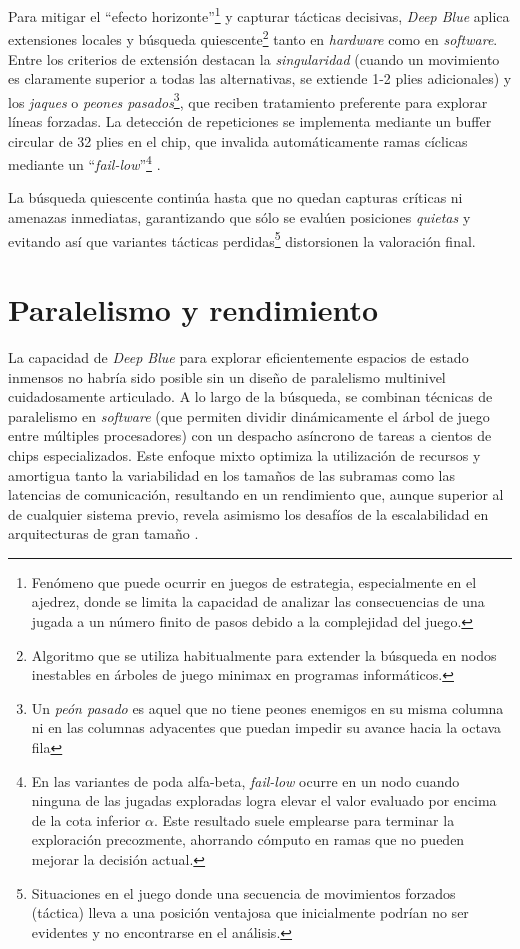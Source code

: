 \documentclass[a4paper, 12pt]{article}
\begin{document}
Para mitigar el “efecto horizonte”\footnote{Fenómeno que puede ocurrir 
en juegos de estrategia, especialmente en el ajedrez, donde se 
limita la capacidad de analizar las consecuencias de una jugada 
a un número finito de pasos debido a la complejidad del juego.} 
y capturar tácticas 
decisivas, \textit{Deep Blue} aplica extensiones locales y 
búsqueda quiescente\footnote{Algoritmo que se utiliza 
habitualmente para extender la búsqueda en nodos inestables en 
árboles de juego minimax en programas informáticos.} 
tanto en \emph{hardware} como en \emph{software}. 
Entre los criterios de extensión destacan la \emph{singularidad} 
(cuando un movimiento es claramente superior a todas las alternativas, 
se extiende 1-2 plies adicionales) y los \emph{jaques} o 
\emph{peones pasados}\footnote{Un \emph{peón pasado} 
es aquel que no tiene peones enemigos en su misma columna ni en 
las columnas adyacentes que puedan impedir su avance hacia la 
octava fila}, 
que reciben tratamiento 
preferente para explorar líneas forzadas. 
La detección de repeticiones se implementa mediante un buffer 
circular de 32 plies en el chip, que invalida automáticamente 
ramas cíclicas mediante un “\emph{fail-low}”\footnote{En 
las variantes de poda alfa-beta, \emph{fail-low} 
ocurre en un nodo cuando ninguna de las jugadas exploradas 
logra elevar el valor evaluado por encima de la cota inferior 
\(\alpha\). Este resultado suele emplearse 
para terminar la exploración precozmente, ahorrando cómputo en 
ramas que no pueden mejorar la decisión actual.} 
\cite{campbell1999search}.  

La búsqueda quiescente continúa hasta que no quedan capturas 
críticas ni amenazas inmediatas, garantizando que sólo se 
evalúen posiciones \emph{quietas} y evitando así que variantes 
tácticas perdidas\footnote{Situaciones en el juego donde una secuencia de movimientos forzados (táctica) lleva a una posición ventajosa que inicialmente podrían no ser evidentes y no encontrarse en el análisis.} 
distorsionen la valoración final.














\section{Paralelismo y rendimiento}

La capacidad de \textit{Deep Blue} para explorar eficientemente 
espacios de estado inmensos no habría sido posible sin un diseño 
de paralelismo multinivel cuidadosamente articulado. A lo largo 
de la búsqueda, se combinan técnicas de paralelismo en \emph{software} 
(que permiten dividir dinámicamente el árbol de juego entre 
múltiples procesadores) con un despacho asíncrono de tareas a 
cientos de chips especializados. Este enfoque mixto optimiza la 
utilización de recursos y amortigua tanto la variabilidad en los 
tamaños de las subramas como las latencias de comunicación, 
resultando en un rendimiento que, aunque superior al de cualquier 
sistema previo, revela asimismo los desafíos de la escalabilidad 
en arquitecturas de gran tamaño \cite{campbell2002deep}. 
\end{document}

